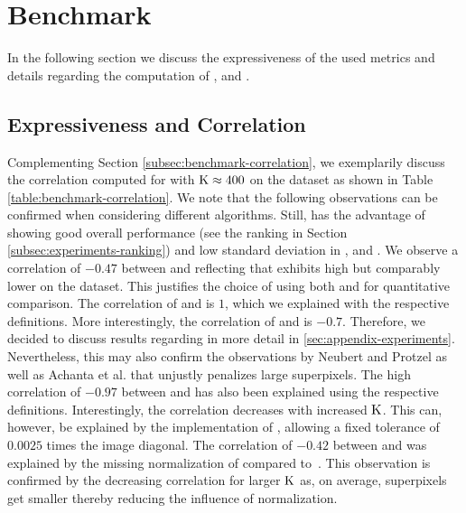 \section{Benchmark}
\label{sec:appendix-benchmark}

In the following section we discuss the expressiveness of the used metrics
and details regarding the computation of \ARec, \AUE and \AEV.

\subsection{Expressiveness and Correlation}
\label{subsec:appendix-benchmark-expressiveness}

Complementing Section \ref{subsec:benchmark-correlation}, we exemplarily discuss
the correlation computed for \SEEDS with $\text{K} \approx 400$ on the \BSDS dataset as shown
in Table \ref{table:benchmark-correlation}. We note that the following observations
can be confirmed when considering different algorithms. Still, \SEEDS has the
advantage of showing good overall performance (see the ranking in Section \ref{subsec:experiments-ranking})
and low standard deviation in \Rec, \UE and \EV. We observe a correlation of $-0.47$
between \Rec and \UE reflecting that \SEEDS exhibits high \Rec but comparably lower
\UE on the \BSDS dataset. This justifies the choice of using both \Rec and \UE for quantitative
comparison. The correlation of \UE and \ASA is $1$, which we explained with the
respective definitions. More interestingly, the correlation of \UE and \UEL is $-0.7$.
Therefore, we decided to discuss results regarding \UEL in more detail in
\ref{sec:appendix-experiments}. Nevertheless, this may also confirm the observations
by Neubert and Protzel \cite{NeubertProtzel:2012} as well as
Achanta et al. \cite{AchantaShajiSmithLucchiFuaSuesstrunk:2012} that \UEL
unjustly penalizes large superpixels.
The high correlation of $-0.97$ between \MDE and \Rec has also been explained using
the respective definitions. Interestingly, the correlation decreases with increased $\text{K}$.
This can, however, be explained by the implementation of \Rec, allowing a fixed tolerance
of $0.0025$ times the image diagonal. The correlation of $-0.42$ between \ICV and \EV
was explained by the missing normalization of \ICV compared to~\EV. This observation
is confirmed by the decreasing correlation for larger $\text{K}$ as, on average, superpixels
get smaller thereby reducing the influence of normalization.


